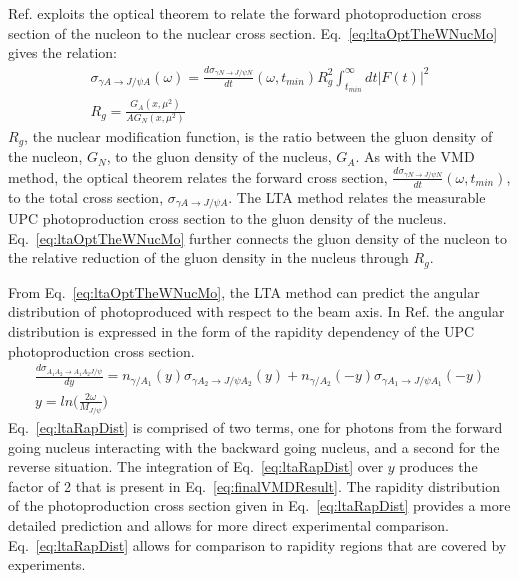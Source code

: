    Ref. \cite{lta2011.09} exploits the optical theorem to relate the forward 
     photoproduction cross section of the nucleon to the nuclear cross section. 
   Eq.~\ref{eq:ltaOptTheWNucMo} gives the relation:
   \begin{eqnarray} \label{eq:ltaOptTheWNucMo}
     \sigma_{\gamma A\rightarrow J/\psi A}(\omega)=
     \frac{d\sigma_{\gamma N\rightarrow J/\psi N}}{dt}(\omega,t_{min})
     R_{g}^{2}\int_{t_{min}}^{\infty}dt|F(t)|^{2} \\
     R_{g}=\frac{G_{A}(x,\mu^{2})}{AG_{N}(x,\mu^{2})} \nonumber 
   \end{eqnarray} 
   $R_{g}$, the nuclear modification function, is the ratio between the gluon 
     density of the nucleon, $G_{N}$, to the gluon density of the nucleus, 
     $G_{A}$.
   As with the VMD method, the optical theorem relates the forward cross 
     section, $\frac{d\sigma_{\gamma N\rightarrow J/\psi N}}{dt}(\omega,t_{min})$,
     to the total cross section, $\sigma_{\gamma A\rightarrow J/\psi A}$. 
   The LTA method relates the measurable UPC photoproduction cross section 
     to the gluon density of the nucleus.  
   Eq.~\ref{eq:ltaOptTheWNucMo} further connects the gluon density of the 
     nucleon to the relative reduction of the gluon density in the nucleus 
     through $R_{g}$.

   From Eq.~\ref{eq:ltaOptTheWNucMo}, the LTA method can predict the angular 
     distribution of photoproduced \JPsi{} with respect to the beam axis. 
   In Ref. \cite{lta2012.03} the angular distribution is expressed in the form 
     of the rapidity dependency of the UPC photoproduction cross section. 
   \begin{eqnarray} \label{eq:ltaRapDist}
     \frac{d\sigma_{A_{1}A_{2}\rightarrow A_{1}A_{2}J/\psi}}{dy}=
       n_{\gamma/A_{1}}(y)\sigma_{\gamma A_{2}\rightarrow J/\psi A_{2}}(y)
       +n_{\gamma/A_{2}}(-y)\sigma_{\gamma A_{1}\rightarrow J/\psi A_{1}}(-y) \\
       y=ln\Big(\frac{2\omega}{M_{J/\psi}}\Big) \nonumber
   \end{eqnarray}
   Eq.~\ref{eq:ltaRapDist} is comprised of two terms, one for photons from the
     forward going nucleus interacting with the backward going nucleus, and 
     a second for the reverse situation. 
   The integration of Eq.~\ref{eq:ltaRapDist} over $y$ produces the factor of 2 
     that is present in Eq.~\ref{eq:finalVMDResult}.
   The rapidity distribution of the photoproduction cross section given in 
     Eq.~\ref{eq:ltaRapDist} provides a more detailed prediction and allows for
     more direct experimental comparison.
   Eq.~\ref{eq:ltaRapDist} allows for comparison to rapidity regions that are 
     covered by experiments.
  
